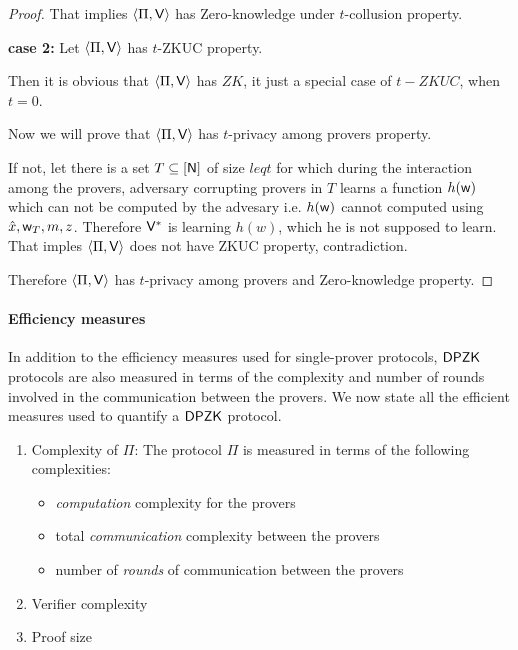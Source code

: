 \begin{proof}
\begin{comment}
	$H_0 \stackrel{c}{\approx} H_1$ due to Zero-knowledge property
	
	$H_1 \stackrel{c}{\approx} H_2$ due to $t$-privacy among provers
	
	These two relation implies $H_0 \stackrel{c}{\approx} H_2$.
\end{comment}
	That implies $\langle \Pi,\mathsf{V}\rangle$ has Zero-knowledge under $t$-collusion property.
	
	\textbf{case 2:} Let $\langle \Pi,\mathsf{V}\rangle$ has $t$-ZKUC property.
	
	Then it is obvious that $\langle \Pi,\mathsf{V}\rangle$ has $ZK$, it just a special case of $t-ZKUC$, when $t=0$.
	
	Now we will prove that $\langle \Pi,\mathsf{V}\rangle$ has $t$-privacy among provers property. 
	
	If not, let there is a set $T\subseteq [\mathsf{N}]$ of size $leq t$ for which during the interaction among the provers, adversary corrupting provers in $T$ learns a function $h(\mathsf{w})$ which can not be computed by the advesary i.e. $h(\mathsf{w})$ cannot computed using $\hat{x}, \mathsf{w}_T, m, z$. Therefore $\mathsf{V}^*$ is learning $h(w)$, which he is not supposed to learn. That imples $\langle \Pi,\mathsf{V}\rangle$ does not have ZKUC property, contradiction.
	
	Therefore $\langle \Pi,\mathsf{V}\rangle$ has $t$-privacy among provers and Zero-knowledge property.
\end{proof}


\paragraph{Efficiency measures}
In addition to the efficiency measures used for single-prover protocols, $\mathsf{DPZK}$ protocols are also measured in terms of the complexity and number of rounds involved in the communication between the provers. We now state all the efficient measures used to quantify a $\mathsf{DPZK}$ protocol.
\begin{enumerate}
\item Complexity of $\Pi$: The protocol $\Pi$ is measured in terms of the following complexities:
\begin{itemize}
\item \textit{computation} complexity for the provers
\item total \textit{communication} complexity between the provers
\item number of \textit{rounds} of communication between the provers
\end{itemize}
\item Verifier complexity
\item Proof size
\end{enumerate}

